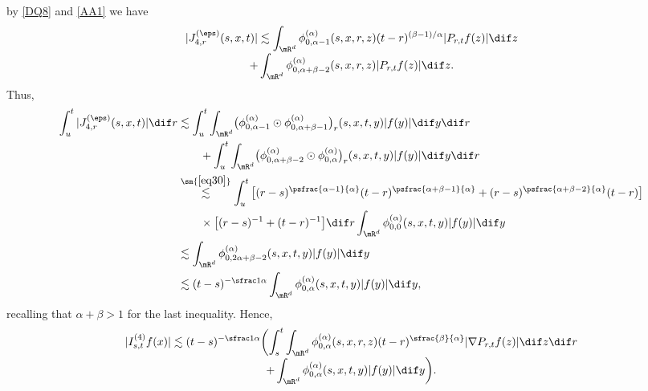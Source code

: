 by \eqref{DQ8} and \eqref{AA1} we have
\begin{multline*}
|J^{(\eps)}_{4,r}(s,x,t)|\lesssim\int_{\mR^d}\phi^{(\alpha)}_{0,\alpha-1}(s,x,r,z) (t-r)^{(\beta-1)/\alpha}|P_{r,t}f(z)|\dif z\\[-3pt]
+\int_{\mR^d}\phi^{(\alpha)}_{0,\alpha+\beta-2}(s,x,r,z)|P_{r,t}f(z)|\dif z.
\end{multline*}
Thus,\vspace*{-3pt}
\begin{align*}
\int^t_{u}|J^{(\eps)}_{4,r}(s,x,t)|\dif r&\lesssim\int^t_{u}\int_{\mR^d}\bigl(\phi^{(\alpha)}_{0,\alpha-1}
\odot\phi^{(\alpha)}_{0,\alpha+\beta-1}\bigr)_r(s,x,t,y)|f(y)|\dif y\dif r\\
&\qquad+\int^t_{u}\int_{\mR^d}\bigl(\phi^{(\alpha)}_{0,\alpha+\beta-2}
\odot\phi^{(\alpha)}_{0,\alpha}\bigr)_r(s,x,t,y)|f(y)|\dif y\dif r\\
&\stackrel{\sm{\eqref{eq30}}}{\lesssim}\int^t_u\big[(r-s)^{\psfrac{\alpha-1}{\alpha}}(t-r)^{\psfrac{\alpha+\beta-1}{\alpha}}+(r-s)^{\psfrac{\alpha+\beta-2}{\alpha}}(t-r)\big]\\
&\qquad\times\big[(r-s)^{-1}+(t-r)^{-1}\big]\dif r
\int_{\mR^d}\phi^{(\alpha)}_{0,0}(s,x,t,y)|f(y)|\dif y\\
&\lesssim\int_{\mR^d}\phi^{(\alpha)}_{0,2\alpha+\beta-2}(s,x,t,y)|f(y)|\dif y\\
&\lesssim (t-s)^{-\sfrac1\alpha}\int_{\mR^d}\phi^{(\alpha)}_{0,\alpha}(s,x,t,y)|f(y)|\dif y,
\end{align*}
recalling that $\alpha+\beta>1 $ for the last inequality.
Hence,\vspace*{-3pt}
\begin{multline*}
|I^{(4)}_{s,t} f(x)|
\lesssim(t-s)^{-\sfrac1\alpha}\biggl( \int^t_s\int_{\mR^d}\phi^{(\alpha)}_{0,\alpha}(s,x,r,z)(t-r)^{\sfrac{\beta}{\alpha}}|\nabla P_{r,t}f(z)|\dif z\dif r\\[-3pt]
+\int_{\mR^d}\phi^{(\alpha)}_{0,\alpha}(s,x,t,y)|f(y)|\dif y\biggr).
\end{multline*}

